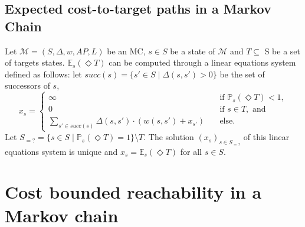 \subsection{Expected cost-to-target paths in a Markov Chain}\label{app-expMC}
  Let $\mathcal{M} = (S, \Delta, w, AP, L)$ be an MC, $s \in S$ be a state of $\mathcal{M}$ and $T \subseteq$ S be a set of targets states. $\mathbb{E}_s(\Diamond T)$ can be computed through a linear equations system defined as follows:
  let $succ(s) = \{ s' \in S \; | \; \Delta(s, s') > 0 \}$ be the set of successors of $s$,
  \[ x_s =
  	\begin{cases}
  	\infty & \quad \text{if } \mathbb{P}_s(\Diamond T) < 1, \\
  	0 & \quad \text{if } s \in T, \text{ and} \\
  	\sum_{s' \in succ(s)} \Delta(s, s') \cdot (w(s, s') + x_{s'}) & \quad \text{else}.
  	\end{cases}
  \]
Let $S_{=?} = \{ s \in S \; | \; \mathbb{P}_s(\Diamond T) = 1 \} \setminus T$. The solution $(x_s)_{s \in S_{=?}}$ of this linear equations system is unique and $x_s = \mathbb{E}_s(\Diamond T)$ for all $s \in S$.

\section{Cost bounded reachability in a Markov chain}\label{app-cbrMC}

